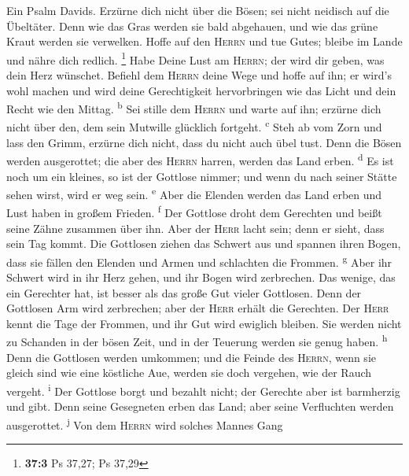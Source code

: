  Ein Psalm Davids. Erzürne dich nicht über die Bösen; sei
nicht neidisch auf die Übeltäter.  Denn wie das Gras
werden sie bald abgehauen, und wie das grüne Kraut werden sie verwelken.
 Hoffe auf den \textsc{Herrn} und tue Gutes; bleibe im
Lande und nähre dich redlich. \footnote{\textbf{37:3} Ps 37,27; Ps 37,29}
 Habe Deine Lust am \textsc{Herrn}; der wird dir geben,
was dein Herz wünschet.  Befiehl dem \textsc{Herrn} deine
Wege und hoffe auf ihn; er wird's wohl machen  und wird
deine Gerechtigkeit hervorbringen wie das Licht und dein Recht wie den
Mittag. \textsuperscript{b}  Sei stille dem \textsc{Herrn}
und warte auf ihn; erzürne dich nicht über den, dem sein Mutwille
glücklich fortgeht. \textsuperscript{c}  Steh ab vom Zorn
und lass den Grimm, erzürne dich nicht, dass du nicht auch übel tust.
 Denn die Bösen werden ausgerottet; die aber des
\textsc{Herrn} harren, werden das Land erben. \textsuperscript{d}
 Es ist noch um ein kleines, so ist der Gottlose nimmer;
und wenn du nach seiner Stätte sehen wirst, wird er weg sein.
\textsuperscript{e}  Aber die Elenden werden das Land
erben und Lust haben in großem Frieden. \textsuperscript{f}
 Der Gottlose droht dem Gerechten und beißt seine Zähne
zusammen über ihn.  Aber der \textsc{Herr} lacht sein;
denn er sieht, dass sein Tag kommt.  Die Gottlosen ziehen
das Schwert aus und spannen ihren Bogen, dass sie fällen den Elenden und
Armen und schlachten die Frommen. \textsuperscript{g} 
Aber ihr Schwert wird in ihr Herz gehen, und ihr Bogen wird zerbrechen.
 Das wenige, das ein Gerechter hat, ist besser als das
große Gut vieler Gottlosen.  Denn der Gottlosen Arm wird
zerbrechen; aber der \textsc{Herr} erhält die Gerechten. 
Der \textsc{Herr} kennt die Tage der Frommen, und ihr Gut wird ewiglich
bleiben.  Sie werden nicht zu Schanden in der bösen Zeit,
und in der Teuerung werden sie genug haben. \textsuperscript{h}
 Denn die Gottlosen werden umkommen; und die Feinde des
\textsc{Herrn}, wenn sie gleich sind wie eine köstliche Aue, werden sie
doch vergehen, wie der Rauch vergeht. \textsuperscript{i}
 Der Gottlose borgt und bezahlt nicht; der Gerechte aber
ist barmherzig und gibt.  Denn seine Gesegneten erben das
Land; aber seine Verfluchten werden ausgerottet. \textsuperscript{j}
 Von dem \textsc{Herrn} wird solches Mannes Gang
